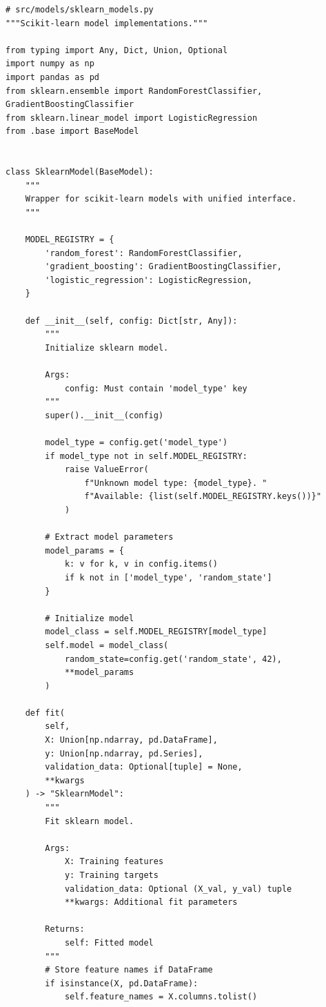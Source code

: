 \begin{lstlisting}[style=python, caption=Sklearn-based model implementation]
# src/models/sklearn_models.py
"""Scikit-learn model implementations."""

from typing import Any, Dict, Union, Optional
import numpy as np
import pandas as pd
from sklearn.ensemble import RandomForestClassifier, GradientBoostingClassifier
from sklearn.linear_model import LogisticRegression
from .base import BaseModel


class SklearnModel(BaseModel):
    """
    Wrapper for scikit-learn models with unified interface.
    """

    MODEL_REGISTRY = {
        'random_forest': RandomForestClassifier,
        'gradient_boosting': GradientBoostingClassifier,
        'logistic_regression': LogisticRegression,
    }

    def __init__(self, config: Dict[str, Any]):
        """
        Initialize sklearn model.

        Args:
            config: Must contain 'model_type' key
        """
        super().__init__(config)

        model_type = config.get('model_type')
        if model_type not in self.MODEL_REGISTRY:
            raise ValueError(
                f"Unknown model type: {model_type}. "
                f"Available: {list(self.MODEL_REGISTRY.keys())}"
            )

        # Extract model parameters
        model_params = {
            k: v for k, v in config.items()
            if k not in ['model_type', 'random_state']
        }

        # Initialize model
        model_class = self.MODEL_REGISTRY[model_type]
        self.model = model_class(
            random_state=config.get('random_state', 42),
            **model_params
        )

    def fit(
        self,
        X: Union[np.ndarray, pd.DataFrame],
        y: Union[np.ndarray, pd.Series],
        validation_data: Optional[tuple] = None,
        **kwargs
    ) -> "SklearnModel":
        """
        Fit sklearn model.

        Args:
            X: Training features
            y: Training targets
            validation_data: Optional (X_val, y_val) tuple
            **kwargs: Additional fit parameters

        Returns:
            self: Fitted model
        """
        # Store feature names if DataFrame
        if isinstance(X, pd.DataFrame):
            self.feature_names = X.columns.tolist()


\end{lstlisting}

